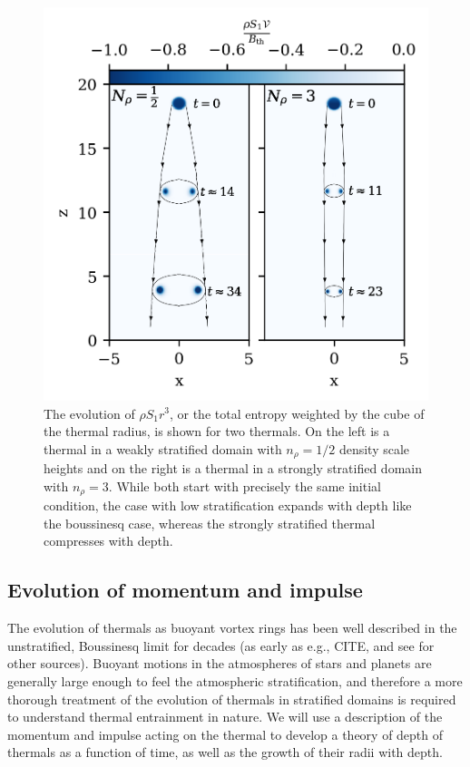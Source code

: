 \documentclass[twocolumn, amsmath, amsfonts, amssymb, trackchanges]{aastex62}
\begin{document}
\begin{figure}[t!]
    \includegraphics[width=\columnwidth]{evolution_colormeshes.png}
    \caption{The evolution of $\rho S_1 r^3$, or the total entropy weighted by
	the cube of the thermal radius, is shown for two thermals. On the left is
	a thermal in a weakly stratified domain with $n_\rho = 1/2$ density scale heights and 
	on the right is a thermal in a strongly stratified domain with $n_\rho = 3$.
	While both start with precisely the same initial condition, the case with low stratification
	expands with depth like the boussinesq case, whereas the strongly stratified thermal
	compresses with depth.
    \label{fig:evolution_colormeshes} }
\end{figure}


\subsection{Evolution of momentum and impulse}
The evolution of thermals as buoyant vortex rings has been well described in
the unstratified, Boussinesq limit for decades (as early as e.g., CITE, and
see \citet{lecoanet&jeevanjee2018} for other sources). Buoyant motions 
in the atmospheres of stars and planets are generally large enough to feel the
atmospheric stratification, and therefore a more thorough treatment of the
evolution of thermals in stratified domains is required to understand 
thermal entrainment in nature. We will use a description of the momentum and
impulse acting on the thermal to develop a theory of depth of thermals as a function
of time, as well as the growth of their radii with depth.
\end{document}
